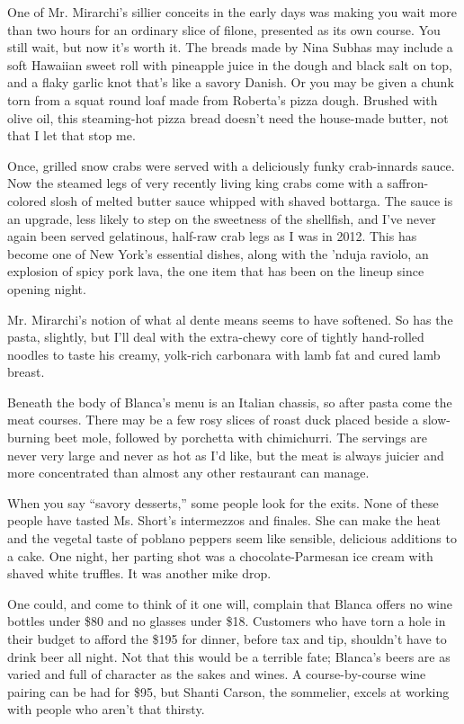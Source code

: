 One of Mr. Mirarchi's sillier conceits in the early days was making you
wait more than two hours for an ordinary slice of filone, presented as
its own course. You still wait, but now it's worth it. The breads made
by Nina Subhas may include a soft Hawaiian sweet roll with pineapple
juice in the dough and black salt on top, and a flaky garlic knot that's
like a savory Danish. Or you may be given a chunk torn from a squat
round loaf made from Roberta's pizza dough. Brushed with olive oil, this
steaming-hot pizza bread doesn't need the house-made butter, not that I
let that stop me.

Once, grilled snow crabs were served with a deliciously funky
crab-innards sauce. Now the steamed legs of very recently living king
crabs come with a saffron-colored slosh of melted butter sauce whipped
with shaved bottarga. The sauce is an upgrade, less likely to step on
the sweetness of the shellfish, and I've never again been served
gelatinous, half-raw crab legs as I was in 2012. This has become one of
New York's essential dishes, along with the 'nduja raviolo, an explosion
of spicy pork lava, the one item that has been on the lineup since
opening night.

Mr. Mirarchi's notion of what al dente means seems to have softened. So
has the pasta, slightly, but I'll deal with the extra-chewy core of
tightly hand-rolled noodles to taste his creamy, yolk-rich carbonara
with lamb fat and cured lamb breast.

Beneath the body of Blanca's menu is an Italian chassis, so after pasta
come the meat courses. There may be a few rosy slices of roast duck
placed beside a slow-burning beet mole, followed by porchetta with
chimichurri. The servings are never very large and never as hot as I'd
like, but the meat is always juicier and more concentrated than almost
any other restaurant can manage.

When you say ``savory desserts,'' some people look for the exits. None
of these people have tasted Ms. Short's intermezzos and finales. She can
make the heat and the vegetal taste of poblano peppers seem like
sensible, delicious additions to a cake. One night, her parting shot was
a chocolate-Parmesan ice cream with shaved white truffles. It was
another mike drop.

One could, and come to think of it one will, complain that Blanca offers
no wine bottles under \$80 and no glasses under \$18. Customers who have
torn a hole in their budget to afford the \$195 for dinner, before tax
and tip, shouldn't have to drink beer all night. Not that this would be
a terrible fate; Blanca's beers are as varied and full of character as
the sakes and wines. A course-by-course wine pairing can be had for
\$95, but Shanti Carson, the sommelier, excels at working with people
who aren't that thirsty.


